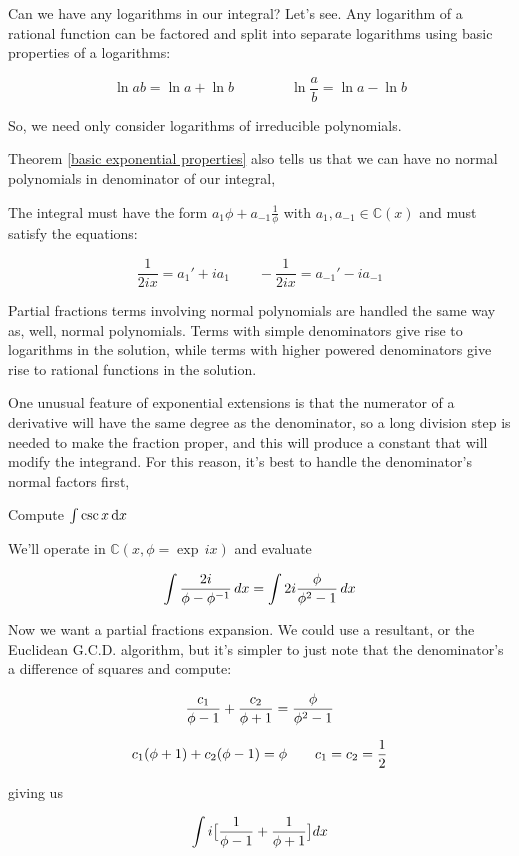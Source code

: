 Can we have any logarithms in our integral?  Let's see.
Any logarithm of a rational function can be factored and
split into separate logarithms using basic properties
of a logarithms:

$$\ln ab = \ln a + \ln b \qquad\qquad \ln\frac{a}{b} = \ln a - \ln b$$

So, we need only consider logarithms of irreducible polynomials.

Theorem \ref{basic exponential properties} also tells us that we can
have no normal polynomials in denominator of our integral,


The integral must have the form $a_1 \phi + a_{-1} \frac{1}{\phi}$
with $a_1, a_{-1} \in {\mathbb C}(x)$ and must satisfy the equations:

$$\frac{1}{2ix} = a_1' + i a_1 \qquad - \frac{1}{2ix} = a_{-1}' - i a_{-1}$$

\endexample

\vfil\eject

Partial fractions terms involving normal polynomials are handled the
same way as, well, normal polynomials.  Terms with simple denominators
give rise to logarithms in the solution, while terms with higher
powered denominators give rise to rational functions in the solution.

One unusual feature of exponential extensions is that the numerator of
a derivative will have the same degree as the denominator, so a long
division step is needed to make the fraction proper, and this will
produce a constant that will modify the integrand.  For this reason,
it's best to handle the denominator's normal factors first,


\example Compute $\int \csc x \, {\rm d}x$

We'll operate in ${\mathbb C}(x, \phi = \exp \,ix)$ and evaluate

$$\int {{2i}\over{\phi - \phi^{-1}}} \,dx = \int 2i {{\phi}\over{\phi^2 - 1}} \,dx$$

Now we want a partial fractions expansion.  We could use a resultant,
or the Euclidean G.C.D. algorithm, but it's simpler to just note that
the denominator's a difference of squares and compute:

$${{c_1}\over{\phi-1}} + {{c_2}\over{\phi+1}} = {{\phi}\over{\phi^2-1}} $$

$${{c_1}(\phi+1)} + {{c_2}(\phi-1)} = \phi \qquad c_1 = c_2 = {1\over2} $$

giving us

$$\int i \big[ {{1}\over{\phi-1}} + {{1}\over{\phi+1}} \big] dx$$

